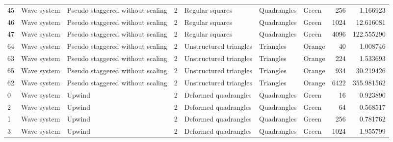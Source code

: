\begin{tabular}{lllrlllrr}
45 &  Wave system &  Pseudo staggered without scaling &               2 &                 Regular squares &           Quadrangles  &      Green &                      256 &                         1.166923 \\
46 &  Wave system &  Pseudo staggered without scaling &               2 &                 Regular squares &           Quadrangles  &      Green &                     1024 &                        12.616081 \\
47 &  Wave system &  Pseudo staggered without scaling &               2 &                 Regular squares &           Quadrangles  &      Green &                     4096 &                       122.555290 \\
64 &  Wave system &  Pseudo staggered without scaling &               2 &          Unstructured triangles &             Triangles  &     Orange &                       40 &                         1.008746 \\
63 &  Wave system &  Pseudo staggered without scaling &               2 &          Unstructured triangles &             Triangles  &     Orange &                      224 &                         1.533693 \\
65 &  Wave system &  Pseudo staggered without scaling &               2 &          Unstructured triangles &             Triangles  &     Orange &                      934 &                        30.219426 \\
62 &  Wave system &  Pseudo staggered without scaling &               2 &          Unstructured triangles &             Triangles  &     Orange &                     6422 &                       355.981562 \\
0  &  Wave system &                            Upwind &               2 &            Deformed quadrangles &           Quadrangles  &      Green &                       16 &                         0.923890 \\
2  &  Wave system &                            Upwind &               2 &            Deformed quadrangles &           Quadrangles  &      Green &                       64 &                         0.568517 \\
1  &  Wave system &                            Upwind &               2 &            Deformed quadrangles &           Quadrangles  &      Green &                      256 &                         0.781762 \\
3  &  Wave system &                            Upwind &               2 &            Deformed quadrangles &           Quadrangles  &      Green &                     1024 &                         1.955799 \\

\end{tabular}
